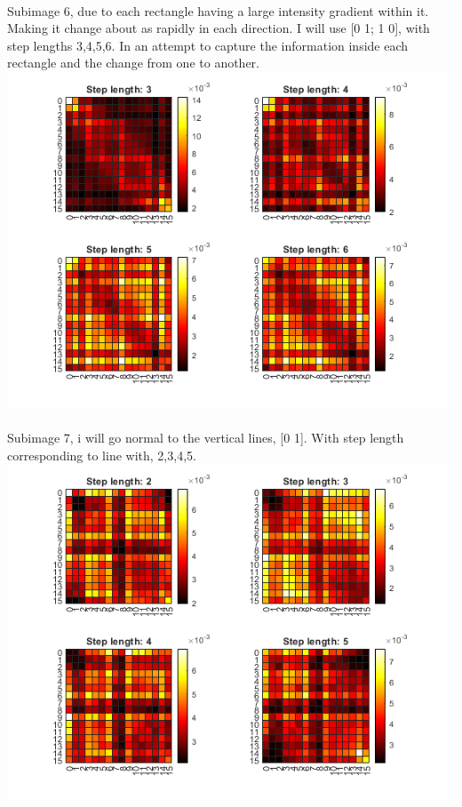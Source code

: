 \documentclass[12pt, letterpaper, twoside]{article}
\begin{document}
\newpage
\ \\
Subimage 6, due to each rectangle having a large intensity gradient within it. Making it change about as rapidly in each direction. I will use [0 1; 1 0], with step lengths 3,4,5,6. In an attempt to capture the information inside each rectangle and the change from one to another.\\
\includegraphics[scale=1]{"glcm6.png"}\\
\newpage
\ \\
Subimage 7, i will go normal to the vertical lines, [0 1]. With step length corresponding to line with, 2,3,4,5.\\
\includegraphics[scale=1]{"glcm7.png"}\\
\end{document}
